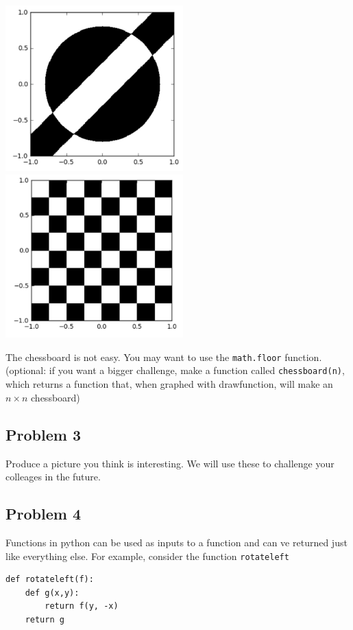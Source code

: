 \documentclass[letterpaper,11pt]{amsart}
\theoremstyle{plain}
\theoremstyle{definition}
\begin{document}
\noindent\includegraphics[width=2.7in]{img5.png}
\noindent\includegraphics[width=2.7in]{img6.png}

The chessboard is not easy. You may want to use the {\texttt{math.floor}} function. (optional: if you want a bigger challenge, make a function called {\texttt{chessboard(n)}}, which returns a function that, when graphed with drawfunction, will make an $n \times n$ chessboard)

\subsection*{Problem 3} Produce a picture you think is interesting. We will use these to challenge your colleages in the future. 

\subsection*{Problem 4} Functions in python can be used as inputs to a function and can ve returned just like everything else. For example, consider the function {\tt rotateleft} 

\begin{lstlisting}
def rotateleft(f):
    def g(x,y):
        return f(y, -x)
    return g
\end{lstlisting}
\end{document}
